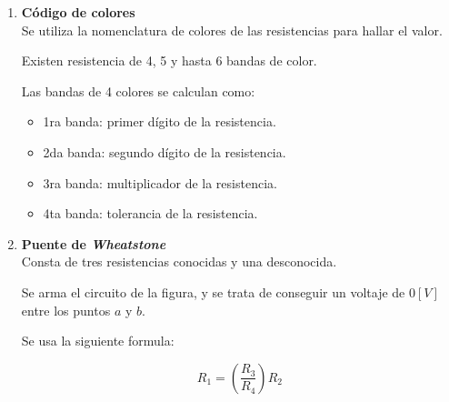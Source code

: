 \documentclass[letter,11pt]{article}
\begin{document}
\begin{enumerate}
\begin{enumerate}
        \item \textbf{Código de colores} \\
        Se utiliza la nomenclatura de colores de las resistencias para hallar el
        valor.

        Existen resistencia de 4, 5 y hasta 6 bandas de color.

        Las bandas de 4 colores se calculan como:

        \begin{itemize}
            \item 1ra banda: primer dígito de la resistencia.
            \item 2da banda: segundo dígito de la resistencia.
            \item 3ra banda: multiplicador de la resistencia.
            \item 4ta banda: tolerancia de la resistencia.
        \end{itemize}

        \item \textbf{Puente de \emph{Wheatstone}} \\
        Consta de tres resistencias conocidas y una desconocida.

        Se arma el circuito de la figura, y se trata de conseguir un voltaje de
        $0 [V]$ entre los puntos $a$ y $b$.

        Se usa la siguiente formula:

        \begin{equation*}
            R_1 = \left(\frac{R_3}{R_4}\right) R_2
        \end{equation*}


\end{enumerate}
\end{enumerate}
\end{document}
